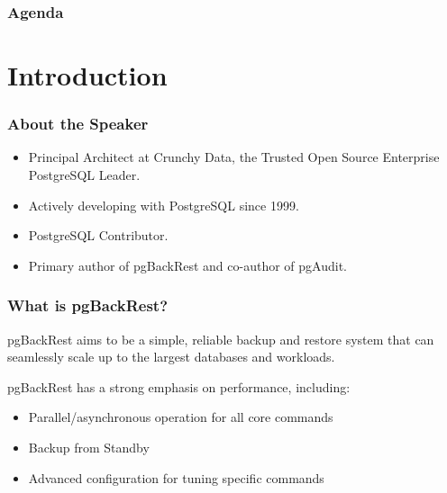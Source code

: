 %
\def\mytitle{High Performance pgBackRest}
\def\mysubject{}
\def\myevent{PGConf.EU 2018}
\def\myauthor{David Steele}
\def\myemail{}
\def\mydate{October 24, 2018}

\def\mysuppressnav{}

\def\mytemplatepath{/template/}


\begin{frame}
    \frametitle{Agenda}
    \tableofcontents
\end{frame}

\section{Introduction}

\begin{frame}
    \frametitle{About the Speaker}

    \begin{itemize}
        \item Principal Architect at Crunchy Data, the Trusted Open Source Enterprise PostgreSQL Leader.
        \item Actively developing with PostgreSQL since 1999.
        \item PostgreSQL Contributor.
        \item Primary author of pgBackRest and co-author of pgAudit.
    \end{itemize}
\end{frame}

\begin{frame}
    \frametitle{What is pgBackRest?}

    pgBackRest aims to be a simple, reliable backup and restore system that can seamlessly scale up to the largest databases and workloads.\pause\vspace{1em}

    pgBackRest has a strong emphasis on performance, including:

    \begin{itemize}
        \item Parallel/asynchronous operation for all core commands\pause
        \item Backup from Standby\pause
        \item Advanced configuration for tuning specific commands
    \end{itemize}
\end{frame}

